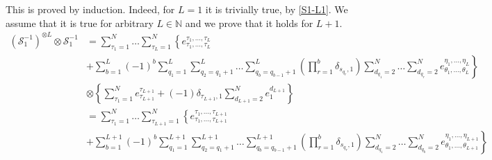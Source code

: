 \documentclass[10pt]{article}
\numberwithin{equation}{section}
\numberwithin{equation}{subsection}
\begin{document}
		This is proved by induction. Indeed, for $L=1$ it is trivially true, by \eqref{S1-L1}. We assume that it is true for arbitrary $L\in \mathbb{N}$ and we prove that it holds for $L+1$. 
		\begin{align*}
			\left(\mathcal{S}_{1}^{-1}\right)^{\otimes L}\otimes \mathcal{S}_{1}^{-1}&=
			\sum_{\tau_{1}=1}^{N}\ldots\sum_{\tau_{L}=1}^{N}\left\{e_{\tau_{1},\ldots,\tau_{L}}^{\tau_{1},\ldots,\tau_{L}}\right. \\&+\left. \sum_{b=1}^{L}(-1)^{b}\sum_{q_{1}=1}^{L}\sum_{q_{2}=q_{1}+1}^{L}\ldots\sum_{q_{b}=q_{b-1}+1}^{L}\left(\prod_{r=1}^{b}\delta_{s_{q_{r}},1}\right)\sum_{d_{q_{1}}=2}^{N}\ldots\sum_{d_{q_{r}}=2}^{N}e_{\theta_{1},\ldots,\theta_{L}}^{\eta_{1},\ldots,\eta_{L}}\right\}
			\\&\otimes
			\left\{ \sum_{\tau_{1}=1}^{N}e_{\tau_{L+1}}^{\tau_{L+1}}+(-1)\delta_{\tau_{L+1},1}\sum_{d_{L+1}=2}^{N}e_{1}^{d_{L+1}}\right\}
			\\&=
			\sum_{\tau_{1}=1}^{N}\ldots\sum_{\tau_{L+1}=1}^{N}\left\{e_{\tau_{1},\ldots,\tau_{L+1}}^{\tau_{1},\ldots,\tau_{L+1}}\right. \\&+\left. \sum_{b=1}^{L+1}(-1)^{b}\sum_{q_{1}=1}^{L+1}\sum_{q_{2}=q_{1}+1}^{L+1}\ldots\sum_{q_{b}=q_{b-1}+1}^{L+1}\left(\prod_{r=1}^{b}\delta_{s_{q_{r}},1}\right)\sum_{d_{q_{1}}=2}^{N}\ldots\sum_{d_{q_{b}}=2}^{N}e_{\theta_{1},\ldots,\theta_{L+1}}^{\eta_{1},\ldots,\eta_{L+1}}\right\}
		\end{align*}
\end{document}

